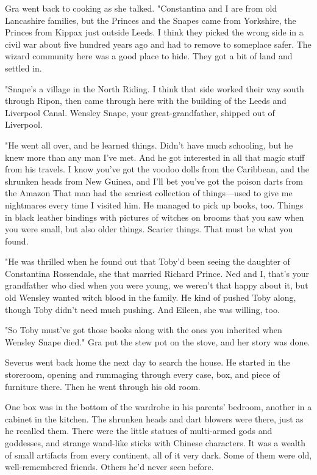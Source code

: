 Gra went back to cooking as she talked. "Constantina and I are from old Lancashire families, but the Princes and the Snapes came from Yorkshire, the Princes from Kippax just outside Leeds. I think they picked the wrong side in a civil war about five hundred years ago and had to remove to someplace safer. The wizard community here was a good place to hide. They got a bit of land and settled in.

"Snape's a village in the North Riding. I think that side worked their way south through Ripon, then came through here with the building of the Leeds and Liverpool Canal. Wensley Snape, your great-grandfather, shipped out of Liverpool.

"He went all over, and he learned things. Didn't have much schooling, but he knew more than any man I've met. And he got interested in all that magic stuff from his travels. I know you've got the voodoo dolls from the Caribbean, and the shrunken heads from New Guinea, and I'll bet you've got the poison darts from the Amazon{\el} That man had the scariest collection of things—used to give me nightmares every time I visited him. He managed to pick up books, too. Things in black leather bindings with pictures of witches on brooms that you saw when you were small, but also older things. Scarier things. That must be what you found.

"He was thrilled when he found out that Toby'd been seeing the daughter of Constantina Rossendale, she that married Richard Prince. Ned and I, that's your grandfather who died when you were young, we weren't that happy about it, but old Wensley wanted witch blood in the family. He kind of pushed Toby along, though Toby didn't need much pushing. And Eileen, she was willing, too.

"So Toby must've got those books along with the ones you inherited when Wensley Snape died." Gra put the stew pot on the stove, and her story was done.

Severus went back home the next day to search the house. He started in the storeroom, opening and rummaging through every case, box, and piece of furniture there. Then he went through his old room.

One box was in the bottom of the wardrobe in his parents' bedroom, another in a cabinet in the kitchen. The shrunken heads and dart blowers were there, just as he recalled them. There were the little statues of multi-armed gods and goddesses, and strange wand-like sticks with Chinese characters. It was a wealth of small artifacts from every continent, all of it very dark. Some of them were old, well-remembered friends. Others he'd never seen before.


